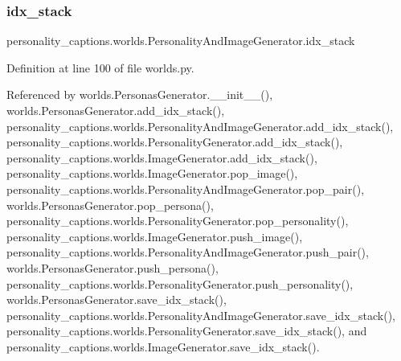 \mbox{\label{classpersonality__captions_1_1worlds_1_1PersonalityAndImageGenerator_abc37ed0e7d15c12a6ba01c75b770dfee}} 
\subsubsection{\texorpdfstring{idx\+\_\+stack}{idx\_stack}}
{\footnotesize\ttfamily personality\+\_\+captions.\+worlds.\+Personality\+And\+Image\+Generator.\+idx\+\_\+stack}



Definition at line 100 of file worlds.\+py.



Referenced by worlds.\+Personas\+Generator.\+\_\+\+\_\+init\+\_\+\+\_\+(), worlds.\+Personas\+Generator.\+add\+\_\+idx\+\_\+stack(), personality\+\_\+captions.\+worlds.\+Personality\+And\+Image\+Generator.\+add\+\_\+idx\+\_\+stack(), personality\+\_\+captions.\+worlds.\+Personality\+Generator.\+add\+\_\+idx\+\_\+stack(), personality\+\_\+captions.\+worlds.\+Image\+Generator.\+add\+\_\+idx\+\_\+stack(), personality\+\_\+captions.\+worlds.\+Image\+Generator.\+pop\+\_\+image(), personality\+\_\+captions.\+worlds.\+Personality\+And\+Image\+Generator.\+pop\+\_\+pair(), worlds.\+Personas\+Generator.\+pop\+\_\+persona(), personality\+\_\+captions.\+worlds.\+Personality\+Generator.\+pop\+\_\+personality(), personality\+\_\+captions.\+worlds.\+Image\+Generator.\+push\+\_\+image(), personality\+\_\+captions.\+worlds.\+Personality\+And\+Image\+Generator.\+push\+\_\+pair(), worlds.\+Personas\+Generator.\+push\+\_\+persona(), personality\+\_\+captions.\+worlds.\+Personality\+Generator.\+push\+\_\+personality(), worlds.\+Personas\+Generator.\+save\+\_\+idx\+\_\+stack(), personality\+\_\+captions.\+worlds.\+Personality\+And\+Image\+Generator.\+save\+\_\+idx\+\_\+stack(), personality\+\_\+captions.\+worlds.\+Personality\+Generator.\+save\+\_\+idx\+\_\+stack(), and personality\+\_\+captions.\+worlds.\+Image\+Generator.\+save\+\_\+idx\+\_\+stack().

\mbox{\label{classpersonality__captions_1_1worlds_1_1PersonalityAndImageGenerator_ad87c83e39fd00d959a3170c67b560b79}} 
